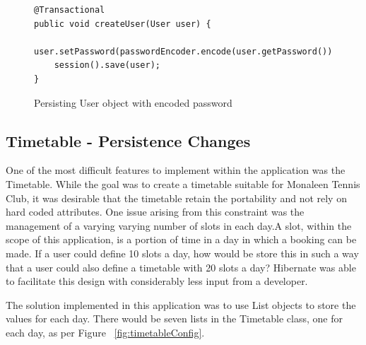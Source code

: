 \begin{figure}[H]
\begin{lstlisting}
@Transactional
public void createUser(User user) {
	user.setPassword(passwordEncoder.encode(user.getPassword()));
	session().save(user);
}
\end{lstlisting}
\caption{Persisting User object with encoded password}
\label{fig:userPersist}
\end{figure}

\subsection{Timetable - Persistence Changes}

One of the most difficult features to implement within the application was the Timetable. While the goal was to create a timetable suitable for Monaleen Tennis Club, it was desirable that the timetable retain the portability and not rely on hard coded attributes. One issue arising from this constraint was the management of a varying varying number of slots in each day.A slot, within the scope of this application, is a portion of time in a day in which a booking can be made. If a user could define 10 slots a day, how would be store this in such a way that a user could also define a timetable with 20 slots a day? Hibernate was able to facilitate this design with considerably less input from a developer.

The solution implemented in this application was to use List objects to store the values for each day. There would be seven lists in the Timetable class, one for each day, as per Figure ~\ref{fig:timetableConfig}.


